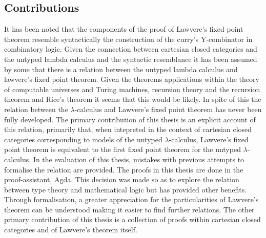 \subsection{Contributions}
It has been noted that the components of the proof of Lawvere's fixed point
theorem resemble syntactically the construction of the curry's Y-combinator in
combinatory logic. Given the connection between cartesian closed categories and
the untyped lambda calculus and the syntactic resemblance it has been assumed by
some that there is a relation between the untyped lambda calculus and lawvere's
fixed point theorem. Given the theorems applications within the theory of
computable universes and Turing machines, recursion theory and the recursion
theorem and Rice's theorem it seems that this would be likely. In spite of this
the relation between the $\lambda$-calculus and Lawvere's fixed point theorem has
never been fully developed. The primary contribution of this thesis is an
explicit account of this relation, primarily that, when intepreted in the
context of cartesian closed categories corresponding to models of the untyped
$\lambda$-calculus, Lawvere's fixed point theorem is equivalent to the first
fixed point theorem for the untyped $\lambda$-calculus. In the evaluation of
this thesis, mistakes with previous attempts to formalise the relation are
provided. The proofs in this thesis are done in the proof-assistant, Agda. This
decision was made so as to explore the relation between type theory and
mathematical logic but has provided other benefits. Through formalisation, a
greater appreciation for the particularities of Lawvere's theorem can be
understood making it easier to find further relations. The other primary
contribution of this thesis is a collection of proofs within cartesian closed
categories and of Lawvere's theorem itself.

